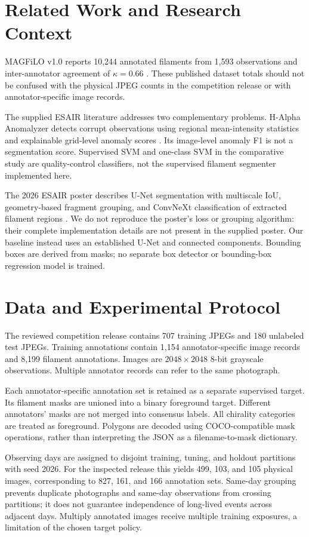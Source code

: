 \documentclass[conference]{IEEEtran}
\begin{document}
\section{Related Work and Research Context}
MAGFiLO v1.0 reports 10,244 annotated filaments from 1,593 observations and
inter-annotator agreement of $\kappa=0.66$ \cite{magfilo}. These published dataset
totals should not be confused with the physical JPEG counts in the competition
release or with annotator-specific image records.

The supplied ESAIR literature addresses two complementary problems.
H-Alpha Anomalyzer detects corrupt observations using regional mean-intensity
statistics and explainable grid-level anomaly scores \cite{softwarex,icdmw}.
Its image-level anomaly F1 is not a segmentation score. Supervised SVM and
one-class SVM in the comparative study are quality-control classifiers,
not the supervised filament segmenter implemented here.

The 2026 ESAIR poster describes U-Net segmentation with multiscale IoU,
geometry-based fragment grouping, and ConvNeXt classification of extracted
filament regions \cite{poster}. We do not reproduce the poster's loss or
grouping algorithm: their complete implementation details are not present
in the supplied poster. Our baseline instead uses an established U-Net
\cite{unet} and connected components. Bounding boxes are derived from masks;
no separate box detector or bounding-box regression model is trained.

\section{Data and Experimental Protocol}
The reviewed competition release contains 707 training JPEGs and 180
unlabeled test JPEGs. Training annotations contain 1,154 annotator-specific
image records and 8,199 filament annotations. Images are $2048\times2048$
8-bit grayscale observations. Multiple annotator records can refer to the
same photograph.

Each annotator-specific annotation set is retained as a separate supervised
target. Its filament masks are unioned into a binary foreground target.
Different annotators' masks are not merged into consensus labels. All
chirality categories are treated as foreground. Polygons are decoded using
COCO-compatible mask operations, rather than interpreting the JSON as a
filename-to-mask dictionary.

Observing days are assigned to disjoint training, tuning, and holdout
partitions with seed 2026. For the inspected release this yields 499, 103,
and 105 physical images, corresponding to 827, 161, and 166 annotation sets.
Same-day grouping prevents duplicate photographs and same-day observations
from crossing partitions; it does not guarantee independence of long-lived
events across adjacent days. Multiply annotated images receive multiple
training exposures, a limitation of the chosen target policy.
\end{document}
